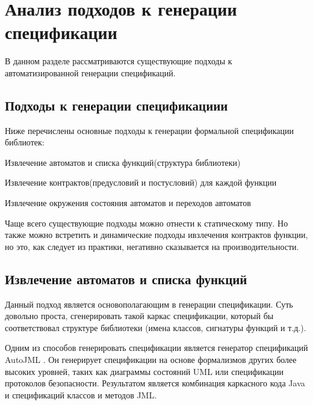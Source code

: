 \chapter{Анализ подходов к генерации спецификации}

В данном разделе рассматриваются существующие подходы к автоматизированной генерации спецификаций.

\section{Подходы к генерации спецификациии}

Ниже перечислены основные подходы к генерации формальной спецификации библиотек:
%
\begin{itemize*}
\item Извлечение автоматов и списка функций(структура библиотеки)
\item Извлечение контрактов(предусловий и постусловий) для каждой функции
\item Извлечение окружения состояния автоматов и переходов автоматов
\end{itemize*}
%

Чаще всего существующие подходы можно отнести к статическому типу. Но также можно встретить и динамические подходы ивзлечения контрактов функции, но это, как следует из практики, негативно сказывается на производительности.

\section{Извлечение автоматов и списка функций}

Данный подход является основополагающим в генерации спецификации. Суть довольно проста, сгенерировать такой каркас спецификации, который бы соответствовал структуре библиотеки (имена классов, сигнатуры функций и т.д.).

Одним из способов генерировать спецификации является генератор спецификаций AutoJML \cite{autoJML_paper} \cite{autoJML}.
Он генерирует спецификации на основе формализмов других более высоких уровней, таких как диаграммы состояний UML или спецификации протоколов безопасности. Результатом является комбинация каркасного кода Java и спецификаций классов и методов JML.

